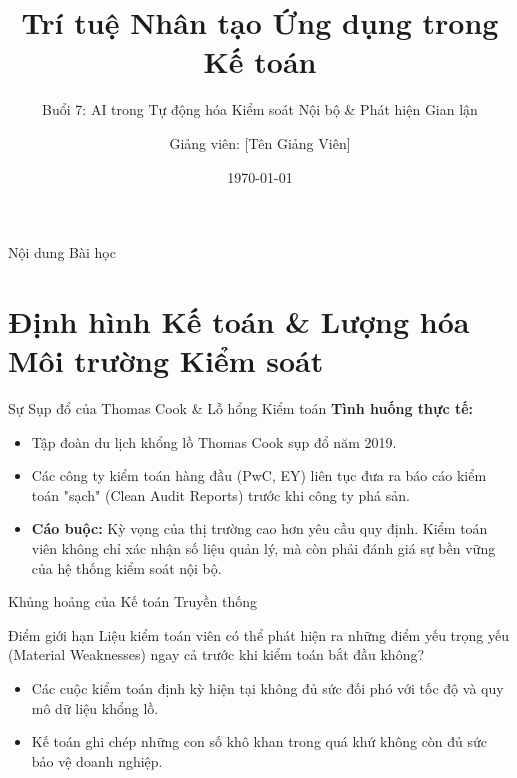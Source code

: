 \documentclass[aspectratio=169]{beamer}
\title[TTNT trong Kế toán - Buổi 7]{Trí tuệ Nhân tạo Ứng dụng trong Kế toán}
\subtitle{Buổi 7: AI trong Tự động hóa Kiểm soát Nội bộ \& Phát hiện Gian lận}
\author{Giảng viên: [Tên Giảng Viên]}
\institute{Đại học Đông Á}
\date{\today}
\begin{document}
\begin{frame}
    \titlepage
\end{frame}

\begin{frame}{Nội dung Bài học}
    \tableofcontents
\end{frame}

\section{Định hình Kế toán \& Lượng hóa Môi trường Kiểm soát}

\begin{frame}{Sự Sụp đổ của Thomas Cook \& Lỗ hổng Kiểm toán}
    \textbf{Tình huống thực tế:}
    \begin{itemize}
        \item Tập đoàn du lịch khổng lồ Thomas Cook sụp đổ năm 2019.
        \item Các công ty kiểm toán hàng đầu (PwC, EY) liên tục đưa ra báo cáo kiểm toán "sạch" (Clean Audit Reports) trước khi công ty phá sản.
        \item \textbf{Cáo buộc:} Kỳ vọng của thị trường cao hơn yêu cầu quy định. Kiểm toán viên không chỉ xác nhận số liệu quản lý, mà còn phải đánh giá sự bền vững của hệ thống kiểm soát nội bộ.
    \end{itemize}
\end{frame}

\begin{frame}{Khủng hoảng của Kế toán Truyền thống}
    \begin{alertblock}{Điểm giới hạn}
        Liệu kiểm toán viên có thể phát hiện ra những điểm yếu trọng yếu (Material Weaknesses) ngay cả trước khi kiểm toán bắt đầu không?
    \end{alertblock}
    \vspace{0.2cm}
    \begin{itemize}
        \item Các cuộc kiểm toán định kỳ hiện tại không đủ sức đối phó với tốc độ và quy mô dữ liệu khổng lồ.
        \item Kế toán ghi chép những con số khô khan trong quá khứ không còn đủ sức bảo vệ doanh nghiệp.
    \end{itemize}
\end{frame}
\end{document}
